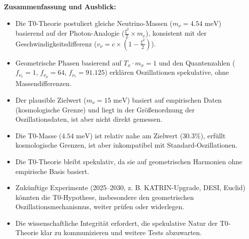 \documentclass[12pt,a4paper]{article}
\newcommand{\xipar}{\xi}
\begin{document}
	\begin{important}
		\textbf{Zusammenfassung und Ausblick:}
		\begin{itemize}
			\item Die T0-Theorie postuliert gleiche Neutrino-Massen (\(m_\nu = 4.54 \text{ meV}\)) basierend auf der Photon-Analogie (\(\frac{\xipar^2}{2} \times m_e\)), konsistent mit der Geschwindigkeitsdifferenz (\(v_\nu = c \times \left(1 - \frac{\xipar^2}{2}\right)\)).
			\item Geometrische Phasen basierend auf \(T_x \cdot m_x = 1\) und den Quantenzahlen (\(f_{\nu_e} = 1\), \(f_{\nu_\mu} = 64\), \(f_{\nu_\tau} = 91.125\)) erklären Oszillationen spekulative, ohne Massendifferenzen.
			\item Der plausible Zielwert (\(m_\nu = 15 \text{ meV}\)) basiert auf empirischen Daten (kosmologische Grenze) und liegt in der Größenordnung der Oszillationsdaten, ist aber nicht direkt gemessen.
			\item Die T0-Masse (\(4.54 \text{ meV}\)) ist relativ nahe am Zielwert (\(30.3\%\)), erfüllt kosmologische Grenzen, ist aber inkompatibel mit Standard-Oszillationen.
			\item Die T0-Theorie bleibt spekulativ, da sie auf geometrischen Harmonien ohne empirische Basis basiert.
			\item Zukünftige Experimente (2025–2030, z. B. KATRIN-Upgrade, DESI, Euclid) könnten die T0-Hypothese, insbesondere den geometrischen Oszillationsmechanismus, weiter prüfen oder widerlegen.
			\item Die wissenschaftliche Integrität erfordert, die spekulative Natur der T0-Theorie klar zu kommunizieren und weitere Tests abzuwarten.
		\end{itemize}
	\end{important}
	
\end{document}
